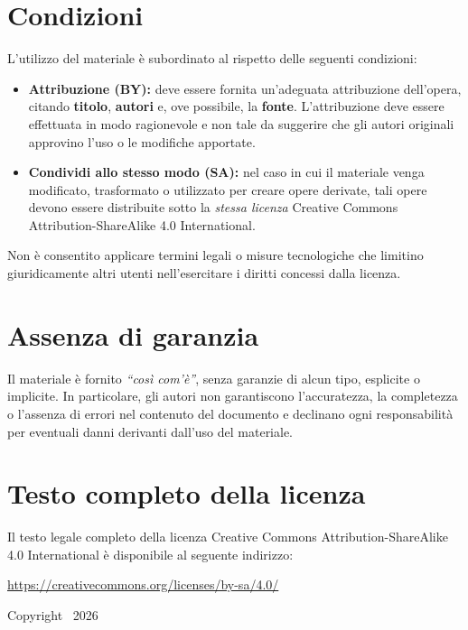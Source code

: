 \section*{Condizioni}

L'utilizzo del materiale è subordinato al rispetto delle seguenti condizioni:

\begin{itemize}
  \item \textbf{Attribuzione (BY):} deve essere fornita un'adeguata attribuzione
  dell'opera, citando \textbf{titolo}, \textbf{autori} e, ove possibile, la \textbf{fonte}.
  L'attribuzione deve essere effettuata in modo ragionevole e non tale da suggerire
  che gli autori originali approvino l'uso o le modifiche apportate.

  \item \textbf{Condividi allo stesso modo (SA):} nel caso in cui il materiale
  venga modificato, trasformato o utilizzato per creare opere derivate, tali opere
  devono essere distribuite sotto la \emph{stessa licenza} Creative Commons
  Attribution-ShareAlike 4.0 International.
\end{itemize}

Non è consentito applicare termini legali o misure tecnologiche che limitino
giuridicamente altri utenti nell'esercitare i diritti concessi dalla licenza.

\vspace{1em}

\section*{Assenza di garanzia}

Il materiale è fornito \emph{``così com'è''}, senza garanzie di alcun tipo,
esplicite o implicite. In particolare, gli autori non garantiscono l'accuratezza,
la completezza o l'assenza di errori nel contenuto del documento e declinano
ogni responsabilità per eventuali danni derivanti dall'uso del materiale.

\vspace{1em}

\section*{Testo completo della licenza}

Il testo legale completo della licenza Creative Commons Attribution-ShareAlike
4.0 International è disponibile al seguente indirizzo:
\begin{center}
\begin{minipage}{0.9\textwidth}
\centering
\url{https://creativecommons.org/licenses/by-sa/4.0/}
\end{minipage}
\end{center}

\vspace{1em}

\noindent
Copyright \textcopyright\ 2026 \\ \BookAuthor

\setlength{\parskip}{0pt}
\setlength{\parindent}{15pt}